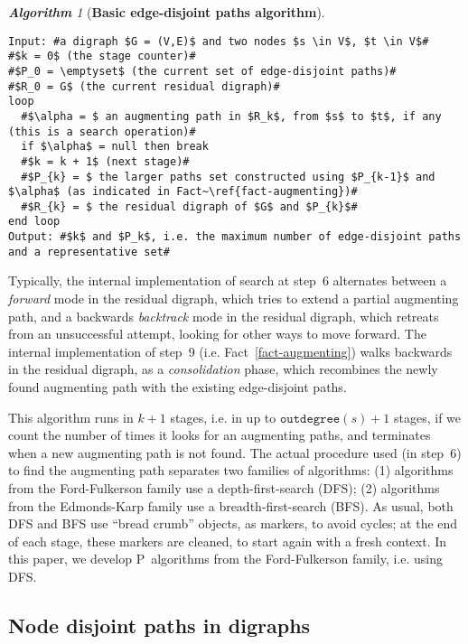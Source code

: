 \documentclass[preliminary,copyright,creativecommons]{eptcs}
\theoremstyle{remark}
\newtheorem{algorithm}[theorem]{\textbf{Algorithm}}
\begin{document}
\begin{algorithm}[\textbf{Basic edge-disjoint paths algorithm}]
\label{alg-basic-edge-disjoint-paths-algorithm}
~ 
\begin{lstlisting}
Input: #a digraph $G = (V,E)$ and two nodes $s \in V$, $t \in V$#
#$k = 0$ (the stage counter)#
#$P_0 = \emptyset$ (the current set of edge-disjoint paths)#
#$R_0 = G$ (the current residual digraph)#
loop
  #$\alpha = $ an augmenting path in $R_k$, from $s$ to $t$, if any (this is a search operation)#
  if $\alpha$ = null then break 
  #$k = k + 1$ (next stage)#
  #$P_{k} = $ the larger paths set constructed using $P_{k-1}$ and $\alpha$ (as indicated in Fact~\ref{fact-augmenting})#
  #$R_{k} = $ the residual digraph of $G$ and $P_{k}$#
end loop
Output: #$k$ and $P_k$, i.e. the maximum number of edge-disjoint paths and a representative set#
\end{lstlisting}

\end{algorithm}
\smallskip

Typically, the internal implementation of search at step~6 alternates between
a \emph{forward} mode in the residual digraph, 
which tries to extend a partial augmenting path,
and a backwards \emph{backtrack} mode in the residual digraph, 
which retreats from an unsuccessful attempt,
looking for other ways to move forward.
The internal implementation of step~9 (i.e. Fact~\ref{fact-augmenting}) walks backwards in the residual digraph,
as a \emph{consolidation} phase, which recombines the newly found augmenting path with the existing edge-disjoint paths.

This algorithm runs in $k+1$ stages, i.e. in up to $\mathtt{outdegree}(s) + 1$ stages,
if we count the number of times it looks for an augmenting paths,
and terminates when a new augmenting path is not found.
The actual procedure used (in step~6) to find the augmenting path separates two families of algorithms:
(1) algorithms from the Ford-Fulkerson family use a depth-first-search (DFS);
(2) algorithms from the Edmonds-Karp family use a breadth-first-search (BFS).
As usual, both DFS and BFS use ``bread crumb'' objects, as markers, to avoid cycles;
at the end of each stage, these markers are cleaned, to start again with a fresh context.
In this paper, we develop P~algorithms from the Ford-Fulkerson family, i.e. using DFS.


\subsection{Node disjoint paths in digraphs}
\label{sec-node-disjoint-paths}
\end{document}
